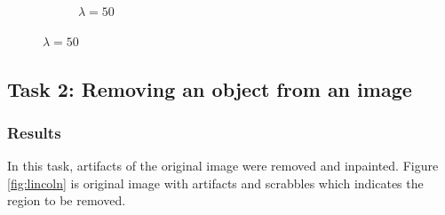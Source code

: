 \documentclass[paper=a4, fontsize=11pt]{scrartcl} %
\numberwithin{equation}{section} %
\numberwithin{figure}{section} %
\numberwithin{table}{section} %
\begin{document}
\begin{figure}[H]
	\begin{subfigure}[b]{0.3\textwidth}
		\noindent{}
	\caption{$\lambda = 50$}
	\end{subfigure}
\end{figure}




\subsection{Task 2: Removing an object from an image}

\subsubsection{Results}

In this task, artifacts of the original image were removed and inpainted. Figure \ref{fig:lincoln} is original image with artifacts and scrabbles which indicates the region to be removed. 
\end{document}
